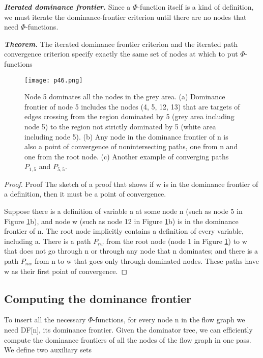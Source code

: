 \textbf{ \large \textit{Iterated dominance frontier.}} Since a $\Phi$-function itself is a kind of definition, we must iterate the dominance-frontier criterion until there are no nodes that need $\Phi$-functions.


\textbf{ \large \textit{Theorem.}} The iterated dominance frontier criterion and the iterated path convergence criterion specify exactly the same set of nodes at which to put $\Phi$-functions

\begin{figure}[htb]
	\centering
	\texttt{[image: p46.png]}
	\caption{Node 5 dominates all the nodes in the grey area. (a) Dominance frontier of node 5 includes the nodes (4, 5, 12, 13) that are targets of edges crossing from the region dominated by 5 (grey area including node 5) to the region not strictly dominated by 5 (white area including node 5). (b) Any node in the dominance frontier of n is also a point of convergence of nonintersecting paths, one from n and one from the root node. (c) Another example of converging paths $P_{1,5}$ and $P_{5,5}$.}
	\label{fig:p46}

\end{figure}


\begin{proof}{Proof}
	The sketch of a proof that shows if w is in the dominance frontier of a definition, then it must be a point of convergence.

	Suppose there is a definition of variable a at some node n (such as node 5 in Figure  \ref{fig:p46}b), and node w (such as node 12 in Figure  \ref{fig:p46}b) is in the dominance frontier of n. The root node implicitly contains a definition of every variable, including a. There is a path $P_{rw}$ from the root node (node 1 in Figure \ref{fig:p46}) to w that does not go through n or through any node that n dominates; and there is a path $P_{nw}$ from n to w that goes only through dominated nodes. These paths have w as their first point of convergence.
\end{proof}


\subsection{Computing the dominance frontier}

To insert all the necessary $\Phi$-functions, for every node n in the flow graph we need DF[n], its dominance frontier. Given the dominator tree, we can efficiently compute the dominance frontiers of all the nodes of the flow graph in one pass. We define two auxiliary sets

